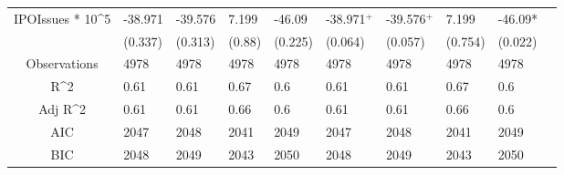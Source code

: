 \documentclass{article}
\begin{document}
\begin{table}[H]
\begin{tabular}{|clllllllll|}
  IPOIssues * 10^5 & -38.971 & -39.576 & 7.199 & -46.09 & -38.971$^{+}$ & -39.576$^{+}$ & 7.199 & -46.09* & \\ 
   & (0.337) & (0.313) & (0.88) & (0.225) & (0.064) & (0.057) & (0.754) & (0.022) & \\ 
  \hline 
 Observations & 4978 & 4978 & 4978 & 4978 & 4978 & 4978 & 4978 & 4978 & \\ 
  R^2 & 0.61 & 0.61 & 0.67 & 0.6 & 0.61 & 0.61 & 0.67 & 0.6 & \\ 
  Adj R^2 & 0.61 & 0.61 & 0.66 & 0.6 & 0.61 & 0.61 & 0.66 & 0.6 & \\ 
  AIC & 2047 & 2048 & 2041 & 2049 & 2047 & 2048 & 2041 & 2049 & \\ 
  BIC & 2048 & 2049 & 2043 & 2050 & 2048 & 2049 & 2043 & 2050 & \\ 
   \hline
\end{tabular}
 
\end{table}
\end{document}
